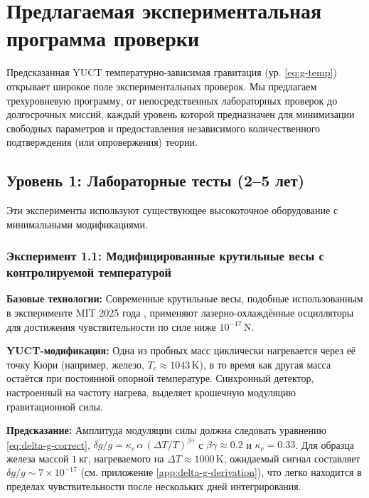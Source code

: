 \documentclass[12pt]{article}
\theoremstyle{remark}
\begin{document}
	\section{Предлагаемая экспериментальная программа проверки}
	\label{sec:experiments}
	
	Предсказанная YUCT температурно-зависимая гравитация (ур. \ref{eq:g-temp}) открывает широкое поле экспериментальных проверок.  
	Мы предлагаем трехуровневую программу, от непосредственных лабораторных проверок до долгосрочных миссий, каждый уровень которой предназначен для минимизации свободных параметров и предоставления независимого количественного подтверждения (или опровержения) теории.
	
	\subsection{Уровень 1: Лабораторные тесты (2–5 лет)}
	\label{subsec:lab-tests}
	
	Эти эксперименты используют существующее высокоточное оборудование с минимальными модификациями.
	
	\subsubsection{Эксперимент 1.1: Модифицированные крутильные весы с контролируемой температурой}
	
	\textbf{Базовые технологии:} Современные крутильные весы, подобные использованным в эксперименте MIT 2025 года \cite{MIT2025}, применяют лазерно-охлаждённые осцилляторы для достижения чувствительности по силе ниже \(10^{-17}\,\mathrm{N}\).
	
	\textbf{YUCT-модификация:} Одна из пробных масс циклически нагревается через её точку Кюри (например, железо, \(T_c\approx1043\,\mathrm{K}\)), в то время как другая масса остаётся при постоянной опорной температуре. Синхронный детектор, настроенный на частоту нагрева, выделяет крошечную модуляцию гравитационной силы.
	
	\textbf{Предсказание:} Амплитуда модуляции силы должна следовать уравнению \ref{eq:delta-g-correct}, \(\delta g/g = \kappa_c\,\alpha\,(\Delta T/T)^{\beta\gamma}\) с \(\beta\gamma\approx0.2\) и \(\kappa_c=0.33\). Для образца железа массой \(1\ \mathrm{кг}\), нагреваемого на \(\Delta T\approx1000\,\mathrm{K}\), ожидаемый сигнал составляет \(\delta g/g \sim 7\times10^{-17}\) (см. приложение \ref{app:delta-g-derivation}), что легко находится в пределах чувствительности после нескольких дней интегрирования.
	
\end{document}

